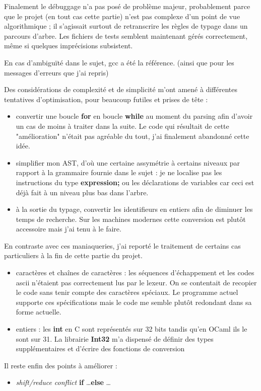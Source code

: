 \documentclass[a4paper]{article}
\begin{document}
Finalement le débuggage n'a pas posé de problème majeur, probablement
parce que le projet (en tout cas cette partie) n'est pas complexe d'un
point de vue algorithmique ; il s'agissait surtout de retranscrire les
règles de typage dans un parcours d'arbre. Les fichiers de
tests semblent maintenant gérés correctement, même si quelques
imprécisions subsistent.

En cas d'ambiguïté dans le sujet, gcc a été la référence. (ainsi que pour
les messages d'erreurs que j'ai repris)

Des considérations de complexité et de simplicité m'ont amené à 
différentes tentatives d'optimisation, pour beaucoup futiles et prises de
tête :

\begin{itemize}
  \item convertir une boucle {\bf for} en boucle {\bf while} au moment du
parsing afin d'avoir un cas de moins à traiter dans la suite. Le code qui
résultait de cette "amélioration" n'était pas agréable du tout, j'ai
finalement abandonné cette idée.
  \item simplifier mon AST, d'où une certaine assymétrie à certains
niveaux par rapport à la grammaire fournie dans le sujet : je ne localise
pas les instructions du type {\bf expression;} ou les déclarations de
variables car ceci est déjà fait à un niveau plus bas dans l'arbre.
  \item à la sortie du typage, convertir les identifieurs en entiers
afin de diminuer les temps de recherche. Sur les machines modernes cette
conversion est plutôt accessoire mais j'ai tenu à le faire. 
\end{itemize}

En contraste avec ces maniaqueries, j'ai reporté le traitement de
certains cas particuliers à la fin de cette partie du projet.

\begin{itemize}
  \item caractères et chaînes de caractères : les séquences
d'échappement et les codes ascii n'étaient pas correctement lus par le
lexeur. On se contentait de recopier le code sans tenir compte des
caractères spéciaux. Le programme actuel supporte ces spécifications mais
le code me semble plutôt redondant dans sa forme actuelle.
  \item entiers : les {\bf int} en C sont représentés sur 32 bits tandis
qu'en OCaml ils le sont sur 31. La librairie {\bf Int32} m'a dispensé de
définir des types supplémentaires et d'écrire des fonctions de conversion 
\end{itemize}

Il reste enfin des points à améliorer :

\begin{itemize}
  \item {\it shift/reduce conflict} {\bf if} \dots {\bf else} \dots
\end{itemize}
\end{document}
